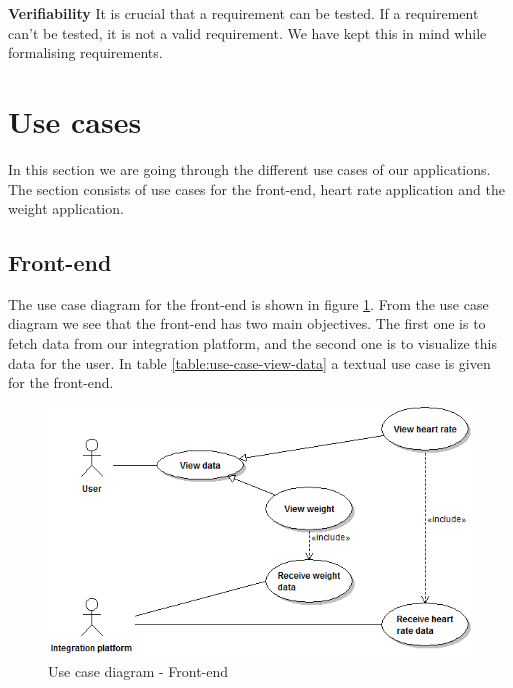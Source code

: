 \textbf{Verifiability}\newline
It is crucial that a requirement can be tested. If a requirement can't be tested, it is not a valid requirement.
We have kept this in mind while formalising requirements.







\section{Use cases}

In this section we are going through the different use cases of our applications.
The section consists of use cases for the front-end, heart rate application and the weight application.

\subsection{Front-end}

The use case diagram for the front-end is shown in figure \ref{figure:use-case-diagram-front-end}.
From the use case diagram we see that the front-end has two main objectives.
The first one is to fetch data from our integration platform, and the second one is to visualize this data for the user.
In table \ref{table:use-case-view-data} a textual use case is given for the front-end.

\begin{figure}[H]
\centering
\includegraphics[scale=0.6]{../Figures/use-case-diagram-front-end.png}
\caption{Use case diagram - Front-end}
\label{figure:use-case-diagram-front-end}
\end{figure}

